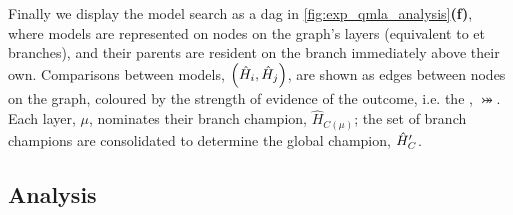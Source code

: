 Finally we display the \gls{model search} as a \gls{dag} in \cref{fig:exp_qmla_analysis}\textbf{(f)}, 
    where models are represented on nodes on the graph's layers (equivalent to \gls{et} branches), 
    and their parents are resident on the branch immediately above their own.
Comparisons between models, $\left(\hat{H}_i, \hat{H}_j\right)$,  are shown as edges between nodes on the graph, 
    coloured by the strength of evidence of the outcome, i.e. the , $\bij$. 
Each layer, $\mu$, nominates their branch champion, $\hat{H}_{C(\mu)}$;
    the set of branch champions are consolidated to determine the global champion, $\hat{H}^{\prime}_C$. 
\subsection{Analysis}\label{sec:exp_qmla_analysis}


